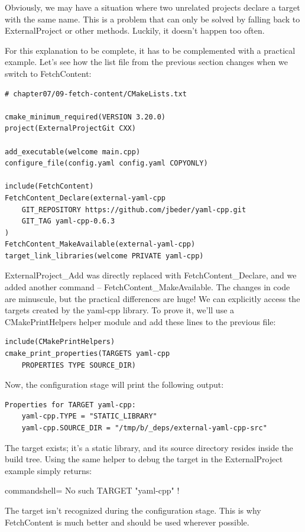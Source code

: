 Obviously, we may have a situation where two unrelated projects declare a target with the same name. This is a problem that can only be solved by falling back to ExternalProject or other methods. Luckily, it doesn't happen too often.

For this explanation to be complete, it has to be complemented with a practical example. Let's see how the list file from the previous section changes when we switch to FetchContent:

\begin{lstlisting}[style=styleCMake]
# chapter07/09-fetch-content/CMakeLists.txt

cmake_minimum_required(VERSION 3.20.0)
project(ExternalProjectGit CXX)

add_executable(welcome main.cpp)
configure_file(config.yaml config.yaml COPYONLY)

include(FetchContent)
FetchContent_Declare(external-yaml-cpp
	GIT_REPOSITORY https://github.com/jbeder/yaml-cpp.git
	GIT_TAG yaml-cpp-0.6.3
)
FetchContent_MakeAvailable(external-yaml-cpp)
target_link_libraries(welcome PRIVATE yaml-cpp)
\end{lstlisting} 

ExternalProject\_Add was directly replaced with FetchContent\_Declare, and we added another command – FetchContent\_MakeAvailable. The changes in code are minuscule, but the practical differences are huge! We can explicitly access the targets created by the yaml-cpp library. To prove it, we'll use a CMakePrintHelpers helper module and add these lines to the previous file:

\begin{lstlisting}[style=styleCMake]
include(CMakePrintHelpers)
cmake_print_properties(TARGETS yaml-cpp
	PROPERTIES TYPE SOURCE_DIR)
\end{lstlisting} 

Now, the configuration stage will print the following output:

\begin{lstlisting}[style=styleCMake]
Properties for TARGET yaml-cpp:
	yaml-cpp.TYPE = "STATIC_LIBRARY"
	yaml-cpp.SOURCE_DIR = "/tmp/b/_deps/external-yaml-cpp-src"
\end{lstlisting} 

The target exists; it's a static library, and its source directory resides inside the build tree. Using the same helper to debug the target in the ExternalProject example simply returns:

\begin{tcblisting}{commandshell={}}
No such TARGET "yaml-cpp" !
\end{tcblisting}

The target isn't recognized during the configuration stage. This is why FetchContent is much better and should be used wherever possible.





